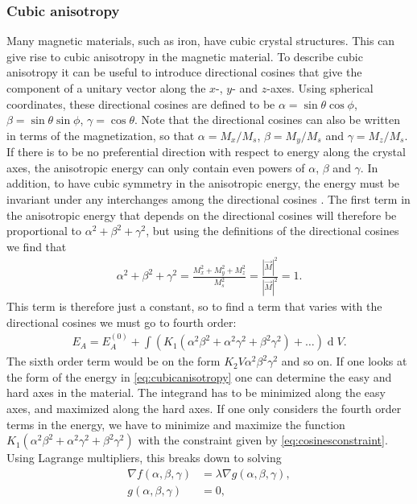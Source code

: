 \documentclass[12pt, a4paper]{article}		%
\renewcommand{\d}[1]{\ensuremath{\operatorname{d}\!{#1}}}
\numberwithin{equation}{section}
\begin{document}
\subsubsection{Cubic anisotropy}
Many magnetic materials, such as iron, have cubic crystal structures. This can give rise to cubic anisotropy in the magnetic material. To describe cubic anisotropy it can be useful to introduce directional cosines that give the component of a unitary vector along the $x$-, $y$- and $z$-axes. Using spherical coordinates, these directional cosines are defined to be $\alpha = \sin\theta\cos\phi$, $\beta = \sin\theta\sin\phi$, $\gamma = \cos\theta$. Note that the directional cosines can also be written in terms of the magnetization, so that $\alpha = M_x/M_s$, $\beta = M_y/M_s$ and $\gamma = M_z/M_s$. If there is to be no preferential direction with respect to energy along the crystal axes, the anisotropic energy can only contain even powers of $\alpha$, $\beta$ and $\gamma$. In addition, to have cubic symmetry in the anisotropic energy, the energy must be invariant under any interchanges among the directional cosines \cite{Kittel:ISSP}. The first term in the anisotropic energy that depends on the directional cosines will therefore be proportional to $\alpha^2+\beta^2+\gamma^2$, but using the definitions of the directional cosines we find that
\begin{align}
\label{eq:cosinesconstraint}
\alpha^2+\beta^2+\gamma^2 = \frac{M_x^2+M_y^2+M_z^2}{M_s^2} = \frac{|\vec{M}|^2}{|\vec{M}|^2} = 1.
\end{align}
This term is therefore just a constant, so to find a term that varies with the directional cosines we must go to fourth order:
\begin{align}
\label{eq:cubicanisotropy}
E_A = E_A^{(0)} + \int (K_1 (\alpha^2\beta^2+\alpha^2\gamma^2+\beta^2\gamma^2) + \ldots ) \d V.
\end{align}
The sixth order term would be on the form $K_2 V \alpha^2\beta^2\gamma^2$ and so on. If one looks at the form of the energy in \eqref{eq:cubicanisotropy} one can determine the easy and hard axes in the material. The integrand has to be minimized along the easy axes, and maximized along the hard axes. If one only considers the fourth order terms in the energy, we have to minimize and maximize the function $K_1 (\alpha^2\beta^2+\alpha^2\gamma^2+\beta^2\gamma^2)$ with the constraint given by \eqref{eq:cosinesconstraint}. Using Lagrange multipliers, this breaks down to solving 
\begin{align}
\nabla f(\alpha, \beta, \gamma) &= \lambda \nabla g(\alpha, \beta, \gamma), \\
g(\alpha, \beta, \gamma) &= 0,
\end{align}
\end{document}
